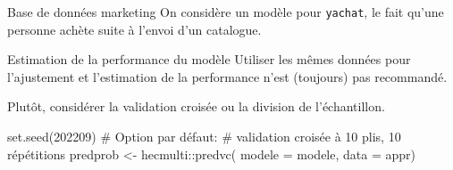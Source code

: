 \documentclass[
  ignorenonframetext,
]{beamer}
\newenvironment{Shaded}{\begin{snugshade}}{\end{snugshade}}
\newcommand{\AttributeTok}[1]{\textcolor[rgb]{0.40,0.45,0.13}{#1}}
\newcommand{\CommentTok}[1]{\textcolor[rgb]{0.37,0.37,0.37}{#1}}
\newcommand{\DecValTok}[1]{\textcolor[rgb]{0.68,0.00,0.00}{#1}}
\newcommand{\FunctionTok}[1]{\textcolor[rgb]{0.28,0.35,0.67}{#1}}
\newcommand{\NormalTok}[1]{\textcolor[rgb]{0.00,0.23,0.31}{#1}}
\newcommand{\OtherTok}[1]{\textcolor[rgb]{0.00,0.23,0.31}{#1}}
\newcommand{\SpecialCharTok}[1]{\textcolor[rgb]{0.37,0.37,0.37}{#1}}
\newcommand{\StringTok}[1]{\textcolor[rgb]{0.13,0.47,0.30}{#1}}
\begin{document}
\begin{frame}[fragile]{Base de données marketing}
\protect\hypertarget{base-de-donnuxe9es-marketing}{}
On considère un modèle pour \texttt{yachat}, le fait qu'une personne
achète suite à l'envoi d'un catalogue.

\begin{Shaded}
\end{Shaded}
\end{frame}

\begin{frame}[fragile]{Estimation de la performance du modèle}
\protect\hypertarget{estimation-de-la-performance-du-moduxe8le}{}
Utiliser les mêmes données pour l'ajustement et l'estimation de la
performance n'est (toujours) pas recommandé.

Plutôt, considérer la validation croisée ou la division de
l'échantillon.

\begin{Shaded}
\begin{Highlighting}[numbers=left,,]
\FunctionTok{set.seed}\NormalTok{(}\DecValTok{202209}\NormalTok{)}
\CommentTok{\# Option par défaut: }
\CommentTok{\# validation croisée à 10 plis, 10 répétitions}
\NormalTok{predprob }\OtherTok{\textless{}{-}}\NormalTok{ hecmulti}\SpecialCharTok{::}\FunctionTok{predvc}\NormalTok{(}
  \AttributeTok{modele =}\NormalTok{ modele,}
  \AttributeTok{data =}\NormalTok{ appr)}
\end{Highlighting}
\end{Shaded}
\end{frame}
\end{document}
